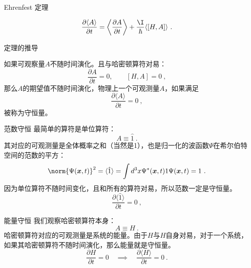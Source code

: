 

\begin{theorem}{Ehrenfest 定理}
\end{theorem}
\begin{equation}
\frac{\partial\langle A\rangle}{\partial t}=\left\langle\frac{\partial A}{\partial t}\right\rangle+\frac{\I}{\hbar}\langle[H, A]\rangle~.
\end{equation}
\begin{issues}
\issueTODO 定理的推导
\end{issues}

如果可观察量$A$不随时间演化。且与哈密顿算符对易：
\begin{equation}
\frac{\partial A}{\partial t}=0,\qquad[H, A]=0~,
\end{equation}
那么$A$的期望值不随时间演化，物理上一个可观测量$A$，如果满足
\begin{equation}
\frac{\partial\langle A\rangle}{\partial t}=0~,
\end{equation}
被称为守恒量。
\begin{example}{范数守恒}
最简单的算符是单位算符：
\begin{equation}
A\equiv \hat 1~.
\end{equation}
其对应的可观测量是全体概率之和（当然是1），也是归一化的波函数$\Psi$在希尔伯特空间的范数的平方：
\begin{equation}
\norm{\Psi(\boldsymbol{x}, t)}^2 = \langle\hat{1}\rangle=\int d^{3}x \Psi^{*}(\boldsymbol{x}, t) 1 \Psi(\boldsymbol{x}, t)=1~.
\end{equation}
因为单位算符不随时间变化，且和所有的算符对易，所以范数一定是守恒量。
\begin{equation}
\frac{\partial\langle \hat 1\rangle}{\partial t}=0~,
\end{equation}
\end{example}
\begin{example}{能量守恒}
我们观察哈密顿算符本身：
\begin{equation}
A\equiv H~.
\end{equation}
哈密顿算符对应的可观测量是系统的能量。由于$H$与$H$自身对易，对于一个系统，如果其哈密顿算符不随时间演化，那么能量就是守恒量。
\begin{equation}
\frac{\partial H}{\partial t}=0 \quad\implies\quad \frac{\partial\langle H\rangle}{\partial t}=0~.
\end{equation}
\end{example}
